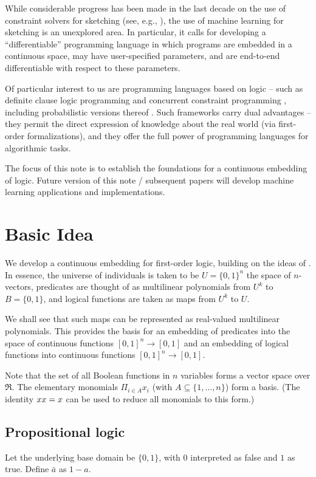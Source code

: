 \documentclass{article} %
\begin{document}
While considerable progress has been made in the last decade on the use of constraint solvers for sketching (see, e.g., \cite{armando}), the use of machine learning for sketching is an unexplored area. In particular, it calls for developing a ``differentiable'' programming language in which programs are embedded in a continuous space, may have user-specified parameters, and are end-to-end differentiable with respect to these parameters. 

Of particular interest to us are programming languages based on logic -- such as definite clause logic programming \cite{Kowalski76} and concurrent constraint programming \cite{CCP}, including probabilistic versions thereof \cite{muggleton:srl07,Gupta97b,cussens}. Such frameworks carry dual advantages -- they permit the direct expression of knowledge about the real world (via first-order formalizations), and they offer the full power of programming languages for algorithmic tasks.

The focus of this note is to establish the foundations for a continuous embedding of logic. Future version of this note / subsequent papers will develop machine learning applications and implementations.

\section{Basic Idea}
We develop a continuous embedding for first-order logic, building on the ideas of \cite{boolean-function}. In essence, the universe of individuals is taken to be $U=\{0,1\}^n$ the space of $n$-vectors, predicates are thought of as multilinear polynomials from $U^k$ to $B=\{0,1\}$, and logical functions are taken as maps from $U^k$ to $U$. 

 We shall see that such maps can be represented as real-valued multilinear polynomials. This provides the basis for an embedding of predicates into the space of continuous functions $[0,1]^n\rightarrow [0,1]$ and an embedding of logical functions into continuous functions $[0,1]^n \rightarrow [0,1]$. 

Note that the set of all Boolean functions in $n$ variables forms a vector space over $\Re$. The elementary monomials $\Pi_{i\in A} x_i$ (with $A \subseteq \{1,\ldots, n\}$) form a basis. (The identity $x x=x$ can be used to reduce all monomials to this form.)

\subsection{Propositional logic}\label{section:prop-logic}
Let the underlying base domain be $\{0,1\}$, with $0$ interpreted as false and $1$ as true. Define $\bar{a}$ as $1-a$. 
\end{document}
